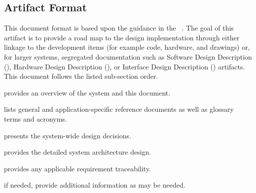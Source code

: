 

\subsection{Artifact Format}
\label{loc:DocOverview_ArtifactFormat}

This document format is based upon the guidance in the \SSDD{} \DID~\cite{ref__SSDD_DID}.
The goal of this artifact is to provide a road map to the design implementation through either linkage to the development items (for example code, hardware, and \CAD drawings) or, for larger systems, segregated documentation such as Software Design Description (\SDD), Hardware Design Description (\HWDD), or Interface Design Description (\IDD) artifacts.
This document follows the listed \SSDD sub-section order.
\begin{description}[itemindent=5pt,topsep=0pt,itemsep=0pt,partopsep=0pt, parsep=0pt]
	\item[Section 1] provides an overview of the system and this document.
	\item[Section 2] lists general and application-specific reference documents as well as glossary terms and acronyms. 
	\item[Section 3] presents the system-wide design decisions.
	\item[Section 4] provides the detailed system architecture design. 
	\item[Section 5] provides any applicable requirement traceability.
	\item[Appendices] if needed, provide additional information as may be needed.
\end{description}